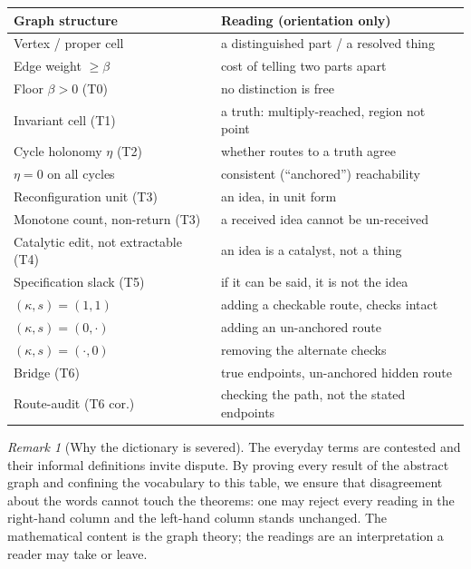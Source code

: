 \documentclass[11pt,a4paper]{article}
\theoremstyle{thmstyle}
\theoremstyle{definition}
\theoremstyle{remark}
\newtheorem{remark}[theorem]{Remark}
\newcommand{\floorc}{\beta}
\newcommand{\hol}{\eta}            %
\begin{document}
\begin{center}
\begin{tabular}{ll}
\toprule
\textbf{Graph structure} & \textbf{Reading (orientation only)}\\
\midrule
Vertex / proper cell & a distinguished part / a resolved thing\\
Edge weight $\ge\floorc$ & cost of telling two parts apart\\
Floor $\floorc>0$ (T0) & no distinction is free\\
Invariant cell (T1) & a truth: multiply-reached, region not point\\
Cycle holonomy $\hol$ (T2) & whether routes to a truth agree\\
$\hol=0$ on all cycles & consistent (``anchored'') reachability\\
Reconfiguration unit (T3) & an idea, in unit form\\
Monotone count, non-return (T3) & a received idea cannot be un-received\\
Catalytic edit, not extractable (T4) & an idea is a catalyst, not a thing\\
Specification slack (T5) & if it can be said, it is not the idea\\
$(\kappa,s)=(1,1)$ & adding a checkable route, checks intact\\
$(\kappa,s)=(0,\cdot)$ & adding an un-anchored route\\
$(\kappa,s)=(\cdot,0)$ & removing the alternate checks\\
Bridge (T6) & true endpoints, un-anchored hidden route\\
Route-audit (T6 cor.) & checking the path, not the stated endpoints\\
\bottomrule
\end{tabular}
\end{center}

\begin{remark}[Why the dictionary is severed]
\label{rem:severed}
The everyday terms are contested and their informal definitions invite
dispute. By proving every result of the abstract graph and confining the
vocabulary to this table, we ensure that disagreement about the words cannot
touch the theorems: one may reject every reading in the right-hand column and
the left-hand column stands unchanged. The mathematical content is the
graph theory; the readings are an interpretation a reader may take or leave.
\end{remark}

\end{document}
